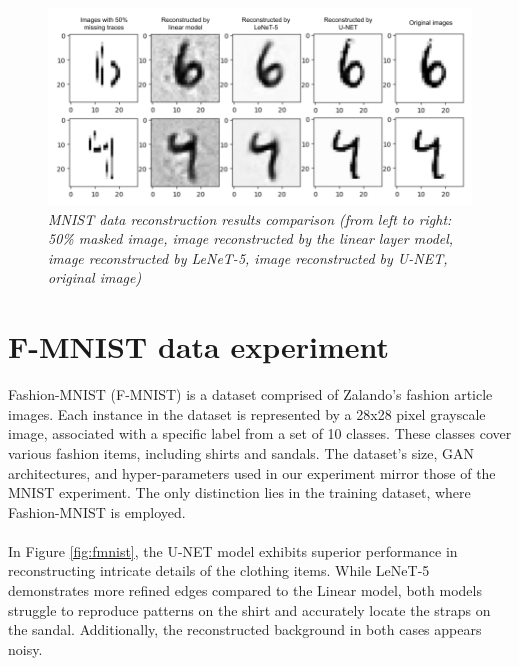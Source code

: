 \begin{figure}[H]
    \centering
    \includegraphics[width=\textwidth]{Figure/Front_page/mnist reconstruction.png}
    \caption{\textit{MNIST data reconstruction results comparison (from left to right: 50\% masked image, image reconstructed by the linear layer model, image reconstructed by LeNeT-5, image reconstructed by U-NET, original image) }}
    \label{fig:mnist}
\end{figure}

\section{F-MNIST data experiment}
Fashion-MNIST (F-MNIST) is a dataset comprised of Zalando's fashion article images. Each instance in the dataset is represented by a 28x28 pixel grayscale image, associated with a specific label from a set of 10 classes. These classes cover various fashion items, including shirts and sandals. \cite{xiao2017fashion} The dataset's size, GAN architectures, and hyper-parameters used in our experiment mirror those of the MNIST experiment. The only distinction lies in the training dataset, where Fashion-MNIST is employed.
\\\\
In Figure \ref{fig:fmnist}, the U-NET model exhibits superior performance in reconstructing intricate details of the clothing items. While LeNeT-5 demonstrates more refined edges compared to the Linear model, both models struggle to reproduce patterns on the shirt and accurately locate the straps on the sandal. Additionally, the reconstructed background in both cases appears noisy.

